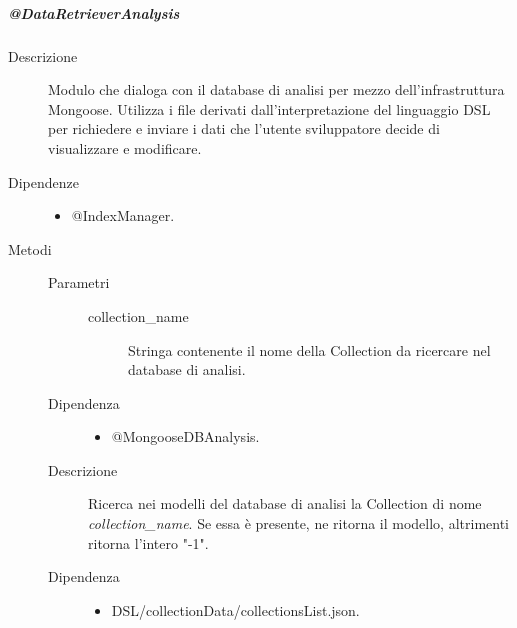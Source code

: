 \subparagraph{@DataRetrieverAnalysis}
\begin{description}
\item[Descrizione] \hfill 
Modulo che dialoga con il database di analisi per mezzo dell'infrastruttura Mongoose. Utilizza i file derivati dall'interpretazione del 
linguaggio DSL per richiedere e inviare i dati che l'utente sviluppatore decide di visualizzare e modificare.
\item[Dipendenze] \hfill 
\begin{itemize}
\item @IndexManager.
\end{itemize}

\item[Metodi] \hfill 
\begin{mldescription}
	 \hfill 
		\begin{description}
			\item[Parametri] \hfill
				\begin{description}
					\item[collection\_name] \hfill
					Stringa contenente il nome della Collection da ricercare nel database di analisi.
				\end{description}
			\item[Dipendenza] \hfill
				\begin{itemize}
					\item @MongooseDBAnalysis.
				\end{itemize}
			\item[Descrizione] \hfill
			Ricerca nei modelli del database di analisi la Collection di nome \textit{collection\_name}.
			Se essa è presente, ne ritorna il modello, altrimenti ritorna l'intero "-1".
		\end{description}

	 \hfill
	 
	 \hfill 
		\begin{description}
			\item[Dipendenza] \hfill
				\begin{itemize}
					\item DSL/collectionData/collectionsList.json.
					
					

\end{itemize}
\end{description}
\end{mldescription}
\end{description}
